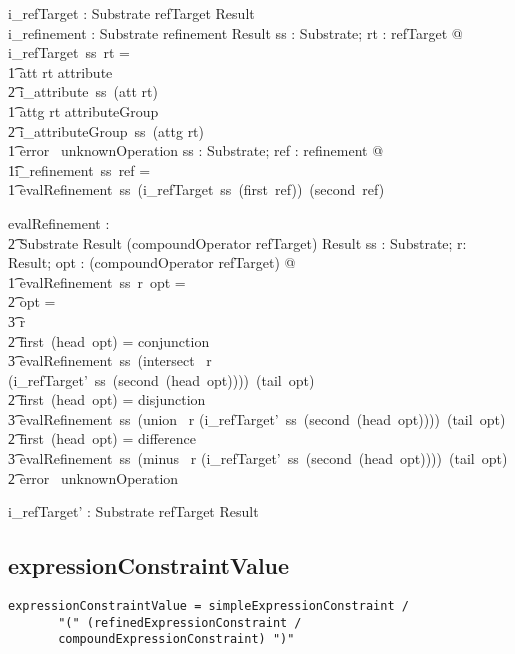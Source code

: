 \documentclass{article}
\begin{document}
\begin{gendef}
   i\_refTarget : Substrate \fun refTarget \fun Result \\
   i\_refinement : Substrate \fun refinement \fun Result
\where
   \forall ss : Substrate; rt : refTarget @ i\_refTarget~ss~rt = \\
\t1 \IF att \inv rt \in attribute \\
\t2 \THEN i\_attribute~ss~(att \inv rt) \\
\t1 \ELSE \IF attg \inv rt \in attributeGroup \\
\t2 \THEN i\_attributeGroup~ss~(attg \inv rt) \\
\t1 \ELSE error~ unknownOperation
\also
   \forall ss : Substrate; ref : refinement @ \\
\t1i\_refinement~ss~ref = \\
\t1 evalRefinement~ss~(i\_refTarget~ss~(first~ref))~(second~ref)
\end{gendef}

\begin{gendef}
   evalRefinement : \\
\t2 Substrate \fun Result \fun \seq (compoundOperator \cross refTarget) \fun Result
\where
   \forall ss : Substrate; r: Result; opt : \seq(compoundOperator \cross refTarget) @ \\
\t1 evalRefinement~ss~r~opt = \\
\t2 \IF opt = \langle \rangle \\
\t3 \THEN r \\
\t2 \ELSE \IF first~(head~opt) = conjunction \\
\t3  \THEN  evalRefinement~ss~(intersect~ r (i\_refTarget'~ss~(second~(head~opt))))~(tail~opt) \\
\t2 \ELSE \IF first~(head~opt)  = disjunction \\
\t3  \THEN  evalRefinement~ss~(union~ r (i\_refTarget'~ss~(second~(head~opt))))~(tail~opt) \\
\t2 \ELSE \IF first~(head~opt)  = difference \\
\t3  \THEN  evalRefinement~ss~(minus~ r (i\_refTarget'~ss~(second~(head~opt))))~(tail~opt) \\
\t2 \ELSE error~ unknownOperation
\end{gendef}
\begin{gendef}
   i\_refTarget' : Substrate \fun refTarget \fun Result
\end{gendef}



\subsection{expressionConstraintValue}
\begin{verbatim}
expressionConstraintValue = simpleExpressionConstraint / 
       "(" (refinedExpressionConstraint / 			
       compoundExpressionConstraint) ")"
\end{verbatim}
\end{document}
